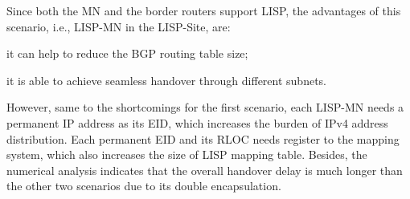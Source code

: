 Since both the MN and the border routers support LISP, the advantages of this scenario, i.e., LISP-MN in the LISP-Site, are: 
\begin{inparaenum}[1)]
	\item it can help to reduce the BGP routing table size;
	\item it is able to achieve seamless handover through different subnets.
\end{inparaenum}
However, same to the shortcomings for the first scenario, each LISP-MN needs a permanent IP address as its EID, which increases the burden of IPv4 address distribution. Each permanent EID and its RLOC needs register to the mapping system, which also increases the size of LISP mapping table. Besides, the numerical analysis indicates that the overall handover delay is much longer than the other two scenarios due to its double encapsulation.


%
%

